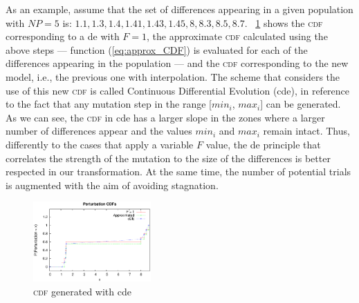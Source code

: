 \documentclass[preprint,3p]{elsarticle}
\newcommand{\CDE}{c{\sc de}}
\newcommand{\DE}{{\sc de}}
\begin{document}
As an example, assume that the set of differences
appearing in a given population with $NP = 5$ is: ${1.1, 1.3, 1.4, 1.41, 1.43, 1.45, 8, 8.3, 8.5, 8.7}$.
%
\figurename~\ref{fig:new_CDFs} shows the \textsc{cdf} corresponding to a \DE{} with $F = 1$, the
approximate \textsc{cdf} calculated using the above steps --- function (\ref{eq:approx_CDF}) is evaluated for each of
the differences appearing in the population ---
and
the \textsc{cdf} corresponding to the new model, i.e., the previous one with interpolation.
%
The scheme that considers the use of this new \textsc{cdf} is called Continuous Differential Evolution (\CDE{}),
in reference to the fact that any mutation step in the range [$min_i$, $max_i$] can be generated.
%
As we can see, the \textsc{cdf} in \CDE{} has a larger slope in the zones where a larger number of differences appear
and the values $min_i$ and $max_i$ remain intact.
%
Thus, differently to the cases that apply a variable $F$ value, 
the \DE{} principle that correlates the strength of the mutation to the size of the differences is better respected
in our transformation.
%
At the same time, the number of potential trials is augmented with the aim of avoiding stagnation.

\begin{figure}[!t]
\centering
\includegraphics[width=0.40\textwidth]{images/CDFs/cdf_new.eps}
\caption{\textsc{cdf} generated with \CDE{}}
\label{fig:new_CDFs}
\end{figure}
\end{document}
